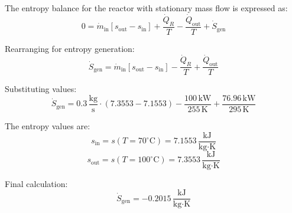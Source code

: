 The entropy balance for the reactor with stationary mass flow is expressed as:  
\[
0 = \dot{m}_{\text{in}} [s_{\text{out}} - s_{\text{in}}] + \frac{\dot{Q}_R}{T} - \frac{\dot{Q}_{\text{out}}}{T} + \dot{S}_{\text{gen}}
\]  

Rearranging for entropy generation:  
\[
\dot{S}_{\text{gen}} = \dot{m}_{\text{in}} [s_{\text{out}} - s_{\text{in}}] - \frac{\dot{Q}_R}{T} + \frac{\dot{Q}_{\text{out}}}{T}
\]  

Substituting values:  
\[
\dot{S}_{\text{gen}} = 0.3 \, \frac{\text{kg}}{\text{s}} \cdot (7.3553 - 7.1553) - \frac{100 \, \text{kW}}{255 \, \text{K}} + \frac{76.96 \, \text{kW}}{295 \, \text{K}}
\]  

The entropy values are:  
\[
s_{\text{in}} = s(T = 70^\circ\text{C}) = 7.1553 \, \frac{\text{kJ}}{\text{kg·K}}
\]  
\[
s_{\text{out}} = s(T = 100^\circ\text{C}) = 7.3553 \, \frac{\text{kJ}}{\text{kg·K}}
\]  

Final calculation:  
\[
\dot{S}_{\text{gen}} = -0.2015 \, \frac{\text{kJ}}{\text{kg·K}}
\]